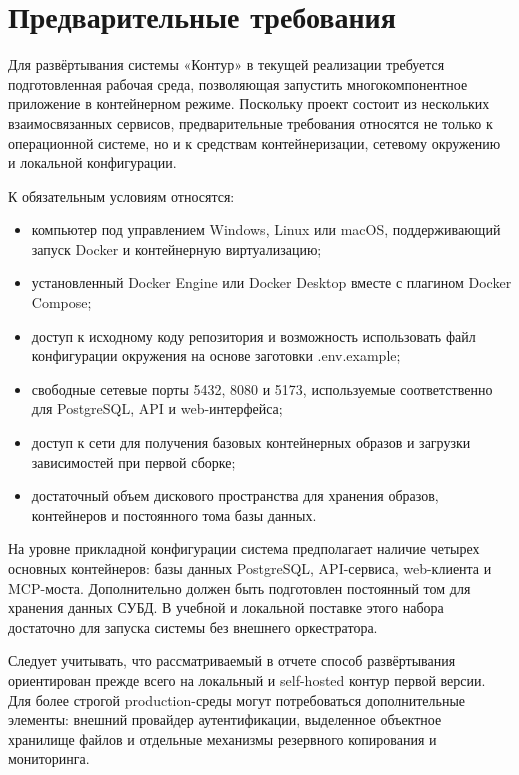 \section{Предварительные требования}
\headingtextsep

Для развёртывания системы «Контур» в текущей реализации требуется подготовленная рабочая среда, позволяющая запустить многокомпонентное приложение в контейнерном режиме. Поскольку проект состоит из нескольких взаимосвязанных сервисов, предварительные требования относятся не только к операционной системе, но и к средствам контейнеризации, сетевому окружению и локальной конфигурации.

К обязательным условиям относятся:

\begin{itemize}
\item компьютер под управлением Windows, Linux или macOS, поддерживающий запуск Docker и контейнерную виртуализацию;
\item установленный Docker Engine или Docker Desktop вместе с плагином Docker Compose;
\item доступ к исходному коду репозитория и возможность использовать файл конфигурации окружения на основе заготовки .env.example;
\item свободные сетевые порты 5432, 8080 и 5173, используемые соответственно для PostgreSQL, API и web-интерфейса;
\item доступ к сети для получения базовых контейнерных образов и загрузки зависимостей при первой сборке;
\item достаточный объем дискового пространства для хранения образов, контейнеров и постоянного тома базы данных.
\end{itemize}

На уровне прикладной конфигурации система предполагает наличие четырех основных контейнеров: базы данных PostgreSQL, API-сервиса, web-клиента и MCP-моста. Дополнительно должен быть подготовлен постоянный том для хранения данных СУБД. В учебной и локальной поставке этого набора достаточно для запуска системы без внешнего оркестратора.

Следует учитывать, что рассматриваемый в отчете способ развёртывания ориентирован прежде всего на локальный и self-hosted контур первой версии. Для более строгой production-среды могут потребоваться дополнительные элементы: внешний провайдер аутентификации, выделенное объектное хранилище файлов и отдельные механизмы резервного копирования и мониторинга.
